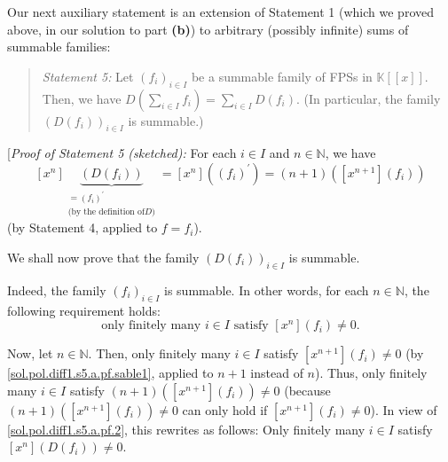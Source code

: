 \documentclass[paper=a4, fontsize=12pt]{scrartcl}%
\let\sumnonlimits\sum
\renewcommand{\sum}{\sumnonlimits\limits}
\theoremstyle{plainsl}
\theoremstyle{definition}
\theoremstyle{remark}
\newenvironment{statement}{\begin{quote}}{\end{quote}}
\begin{document}
\bigskip

Our next auxiliary statement is an extension of Statement 1 (which we proved
above, in our solution to part \textbf{(b)}) to arbitrary (possibly infinite)
sums of summable families:

\begin{statement}
\textit{Statement 5:} Let $\left(  f_{i}\right)  _{i\in I}$ be a summable
family of FPSs in $\mathbb{K}\left[  \left[  x\right]  \right]  $. Then, we
have $D\left(  \sum_{i\in I}f_{i}\right)  =\sum_{i\in I}D\left(  f_{i}\right)
$. (In particular, the family $\left(  D\left(  f_{i}\right)  \right)  _{i\in
I}$ is summable.)
\end{statement}

[\textit{Proof of Statement 5 (sketched):} For each $i\in I$ and
$n\in\mathbb{N}$, we have%
\begin{equation}
\left[  x^{n}\right]  \underbrace{\left(  D\left(  f_{i}\right)  \right)
}_{\substack{=\left(  f_{i}\right)  ^{\prime}\\\text{(by the definition of
}D\text{)}}}=\left[  x^{n}\right]  \left(  \left(  f_{i}\right)  ^{\prime
}\right)  =\left(  n+1\right)  \left(  \left[  x^{n+1}\right]  \left(
f_{i}\right)  \right)  \label{sol.pol.diff1.s5.a.pf.2}%
\end{equation}
(by Statement 4, applied to $f=f_{i}$).

We shall now prove that the family $\left(  D\left(  f_{i}\right)  \right)
_{i\in I}$ is summable.

Indeed, the family $\left(  f_{i}\right)  _{i\in I}$ is summable. In other
words, for each $n\in\mathbb{N}$, the following requirement holds:%
\begin{equation}
\text{only finitely many }i\in I\text{ satisfy }\left[  x^{n}\right]  \left(
f_{i}\right)  \neq0. \label{sol.pol.diff1.s5.a.pf.sable1}%
\end{equation}


Now, let $n\in\mathbb{N}$. Then, only finitely many $i\in I$ satisfy $\left[
x^{n+1}\right]  \left(  f_{i}\right)  \neq0$ (by
\eqref{sol.pol.diff1.s5.a.pf.sable1}, applied to $n+1$ instead of $n$). Thus,
only finitely many $i\in I$ satisfy $\left(  n+1\right)  \left(  \left[
x^{n+1}\right]  \left(  f_{i}\right)  \right)  \neq0$ (because $\left(
n+1\right)  \left(  \left[  x^{n+1}\right]  \left(  f_{i}\right)  \right)
\neq0$ can only hold if $\left[  x^{n+1}\right]  \left(  f_{i}\right)  \neq
0$). In view of \eqref{sol.pol.diff1.s5.a.pf.2}, this rewrites as follows:
Only finitely many $i\in I$ satisfy $\left[  x^{n}\right]  \left(  D\left(
f_{i}\right)  \right)  \neq0$.
\end{document}
